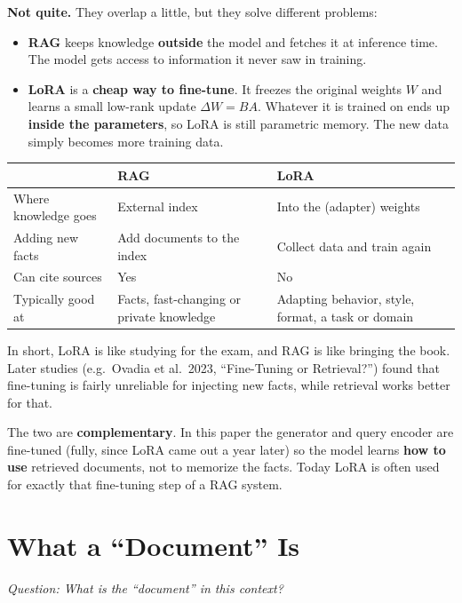 \documentclass[11pt]{article}
\newcommand{\question}[1]{\noindent\textit{Question: #1}\par\medskip}
\begin{document}
\textbf{Not quite.} They overlap a little, but they solve different problems:
\begin{itemize}[nosep]
  \item \textbf{RAG} keeps knowledge \textbf{outside} the model and fetches it at inference time. The model gets access to information it never saw in training.
  \item \textbf{LoRA} is a \textbf{cheap way to fine-tune}. It freezes the original weights $W$ and learns a small low-rank update $\Delta W = BA$. Whatever it is trained on ends up \textbf{inside the parameters}, so LoRA is still parametric memory. The new data simply becomes more training data.
\end{itemize}

\begin{center}
\begin{tabularx}{\textwidth}{@{}l Y Y@{}}
\toprule
 & \textbf{RAG} & \textbf{LoRA} \\
\midrule
Where knowledge goes & External index & Into the (adapter) weights \\
\addlinespace
Adding new facts & Add documents to the index & Collect data and train again \\
\addlinespace
Can cite sources & Yes & No \\
\addlinespace
Typically good at & Facts, fast-changing or private knowledge & Adapting behavior, style, format, a task or domain \\
\bottomrule
\end{tabularx}
\end{center}

In short, LoRA is like studying for the exam, and RAG is like bringing the book. Later studies (e.g.\ Ovadia et al.\ 2023, ``Fine-Tuning or Retrieval?'') found that fine-tuning is fairly unreliable for injecting new facts, while retrieval works better for that.

The two are \textbf{complementary}. In this paper the generator and query encoder are fine-tuned (fully, since LoRA came out a year later) so the model learns \textbf{how to use} retrieved documents, not to memorize the facts. Today LoRA is often used for exactly that fine-tuning step of a RAG system.

\section{What a ``Document'' Is}\label{sec:document}
\question{What is the ``document'' in this context?}
\end{document}
